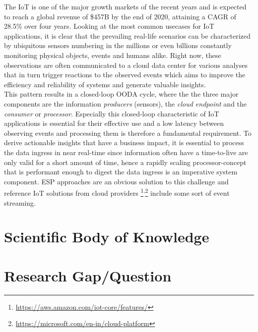 The \acf{IoT} is one of the major growth markets of the recent years and is expected to reach a global revenue of \$457B by the end of 2020, attaining a \acf{CAGR} of 28.5\% over four years.\autocite{Columbus20172017Forecasts} Looking at the most common usecases for IoT applications, it is clear that the prevailing real-life scenarios can be characterized by ubiquitous sensors numbering in the millions or even billions constantly monitoring physical objects, events and humans alike. Right now, these observations are often communicated to a cloud data center for various analyses that in turn trigger reactions to the observed events which aims to improve the efficiency and reliability of systems and generate valuable insights.\autocite{Yannuzzi2014KeyComputing} \\
This pattern results in a closed-loop \acf{OODA} cycle, where the the three major components are the information \textit{producers} (sensors), the \textit{cloud endpoint} and the \textit{consumer} or \textit{processor}.\autocite{Shukla2017BenchmarkingApplications} Especially this closed-loop characteristic of IoT applications is essential for their effective use and a low latency between observing events and processing them is therefore a fundamental requirement. To derive actionable insights that have a business impact, it is essential to process the data ingress in near real-time since information often have a time-to-live are only valid for a short amount of time, hence a rapidly scaling processor-concept that is performant enough to digest the data ingress is an imperative system component. \acf{ESP} approaches are an obvious solution to this challenge and reference IoT solutions from cloud providers \footnote{\url{https://aws.amazon.com/iot-core/features/}}\textsuperscript{,}\footnote{\url{https://microsoft.com/en-in/cloud-platform}} include some sort of event streaming.


\section{Scientific Body of Knowledge}



\section{Research Gap/Question}


